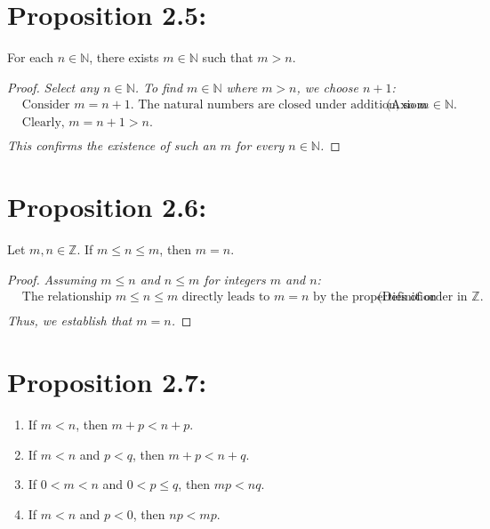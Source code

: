 \section*{Proposition 2.5:}
For each $n \in \mathbb{N}$, there exists $m \in \mathbb{N}$ such that $m > n$.
\begin{proof}
    \textit{Select any $n \in \mathbb{N}$. To find $m \in \mathbb{N}$ where $m > n$, we choose $n + 1$:}
    \begin{align*}
        & \text{Consider $m = n + 1$. The natural numbers are closed under addition, so $m \in \mathbb{N}$.} & & \text{(Axiom 2.1(i))} \\
        & \text{Clearly, $m = n + 1 > n$.} & & \\
    \end{align*}
    \textit{This confirms the existence of such an $m$ for every $n \in \mathbb{N}$.}
\end{proof}


\section*{Proposition 2.6:}
Let $m,n \in \mathbb{Z}$. If $m \leq n \leq m$, then $m = n$.
\begin{proof}
    \textit{Assuming $m \leq n$ and $n \leq m$ for integers $m$ and $n$:}
    \begin{align*}
        & \text{The relationship $m \leq n \leq m$ directly leads to $m = n$ by the properties of order in $\mathbb{Z}$.} & & \text{(Definition of order)} \\
    \end{align*}
    \textit{Thus, we establish that $m = n$.}
\end{proof}


\section*{Proposition 2.7:}
\begin{enumerate}[label=(\roman*)]
    \item If $m < n$, then $m+p < n+p$.
    \item If $m < n$ and $p < q$, then $m+p < n+q$.
    \item If $0 < m < n$ and $0 < p \leq q$, then $mp < nq$.
    \item If $m < n$ and $p < 0$, then $np < mp$.
\end{enumerate}
